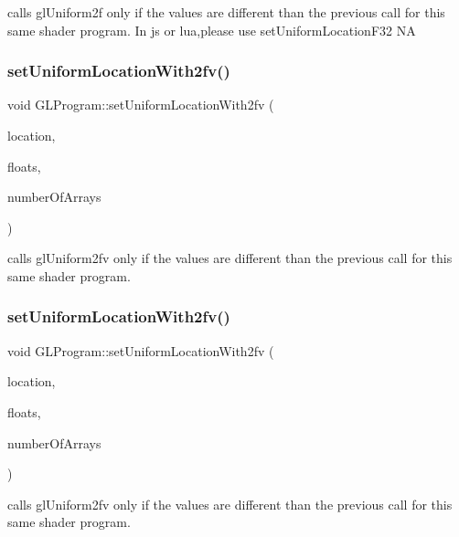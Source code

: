 calls gl\+Uniform2f only if the values are different than the previous call for this same shader program. In js or lua,please use set\+Uniform\+Location\+F32  NA \mbox{\label{classGLProgram_a5b6c67eea6ef5f03383d228fb8900a44}} 
\subsubsection{\texorpdfstring{set\+Uniform\+Location\+With2fv()}{setUniformLocationWith2fv()}\hspace{0.1cm}{\footnotesize\ttfamily [1/2]}}
{\footnotesize\ttfamily void G\+L\+Program\+::set\+Uniform\+Location\+With2fv (\begin{DoxyParamCaption}\item[{G\+Lint}]{location,  }\item[{const G\+Lfloat $\ast$}]{floats,  }\item[{unsigned int}]{number\+Of\+Arrays }\end{DoxyParamCaption})}

calls gl\+Uniform2fv only if the values are different than the previous call for this same shader program. \mbox{\label{classGLProgram_a5b6c67eea6ef5f03383d228fb8900a44}} 
\subsubsection{\texorpdfstring{set\+Uniform\+Location\+With2fv()}{setUniformLocationWith2fv()}\hspace{0.1cm}{\footnotesize\ttfamily [2/2]}}
{\footnotesize\ttfamily void G\+L\+Program\+::set\+Uniform\+Location\+With2fv (\begin{DoxyParamCaption}\item[{G\+Lint}]{location,  }\item[{const G\+Lfloat $\ast$}]{floats,  }\item[{unsigned int}]{number\+Of\+Arrays }\end{DoxyParamCaption})}

calls gl\+Uniform2fv only if the values are different than the previous call for this same shader program. \mbox{\label{classGLProgram_abefc77093c5e21dfdf7e0c71bed024c6}} 
